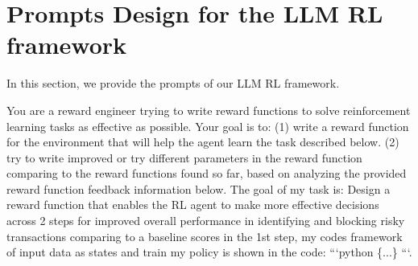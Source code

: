 \documentclass[11pt]{article}
\begin{document}
%


\appendix
\section{Prompts Design for the LLM RL framework}
\label{appendix:Prompts Design}
In this section, we provide the prompts of our LLM RL framework.

\begin{tcolorbox}[title=Prompt 1: Initial Instruction Prompts, colframe=blue, colback=white, breakable]

You are a reward engineer trying to write reward functions to solve reinforcement learning tasks as effective as possible.
Your goal is to: 
(1) write a reward function for the environment that will help the agent learn the task described below. 
(2) try to write improved or try different parameters in the reward function comparing to the reward functions found so far, based on analyzing the provided reward function feedback information below.
The goal of my task is: Design a reward function that enables the RL agent to make more effective decisions across 2 steps for improved overall performance in identifying and blocking risky transactions comparing to a baseline scores in the 1st step, my codes framework of input data as states and train my policy is shown in the code: ```python \{...\} ```.
\end{tcolorbox}
\end{document}
